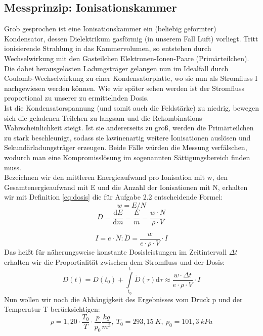 \subsection{Messprinzip: Ionisationskammer}
Grob gesprochen ist eine Ionisationskammer ein (beliebig geformter) Kondensator, dessen Dielektrikum gasförmig (in unserem Fall Luft) vorliegt. Tritt ionisierende Strahlung in das Kammervolumen, so entstehen durch Wechselwirkung mit den Gasteilchen Elektronen-Ionen-Paare (Primärteilchen). Die dabei herausgelösten Ladungsträger gelangen nun im Idealfall durch Coulomb-Wechselwirkung zu einer Kondensatorplatte, wo sie nun als Stromfluss I nachgewiesen werden können. Wie wir später sehen werden ist der Stromfluss proportional zu unserer zu ermittelnden Dosis.\\ 
Ist die Kondensatorspannung (und somit auch die Feldstärke) zu niedrig, bewegen sich die geladenen Teilchen zu langsam und die Rekombinations-Wahrscheinlichkeit steigt. Ist sie andererseits zu groß, werden die Primärteilchen zu stark beschleunigt, sodass sie lawinenartig weitere Ionisationen auslösen und Sekundärladungsträger erzeugen. Beide Fälle würden die Messung verfälschen, wodurch man eine Kompromisslösung im sogenannten Sättigungsbereich finden muss.\\
Bezeichnen wir den mittleren Energieaufwand pro Ionisation mit w, den Gesamtenergieaufwand mit E und die Anzahl der Ionisationen mit N, erhalten wir mit Definition \eqref{eq:dosis} die für Aufgabe 2.2 entscheidende Formel:
\begin{equation}
	w = E / N
\end{equation}
\begin{equation}
	D = \frac{\textrm{d}E}{\textrm{d}m}=\frac{E}{m}=\frac{w \cdot N}{\rho \cdot V}
\end{equation}

\begin{equation}
	I = e \cdot \dot{N}: \dot{D} = \frac{w}{e \cdot \rho \cdot V} \cdot I
\end{equation}
Das heißt für näherungsweise konstante Dosisleistungen im Zeitintervall $\Delta t$ erhalten wir die Proportialität zwischen dem Stromfluss und der Dosis:
\begin{equation}
	D(t) = D(t_0) + \int \limits_{t_0}^{t} \dot{D}(\tau) \mathrm{d}\tau \approx \frac{w \cdot \Delta t}{e \cdot \rho \cdot V} \cdot I
\end{equation}
Nun wollen wir noch die Abhängigkeit des Ergebnisses vom Druck p und der Temperatur T berücksichtigen:
\begin{equation}
	\rho = 1,20 \cdot \frac{T_0}{T} \cdot \frac{p}{p_0} \frac{kg}{m^3},
	\ T_0 = 293,15\ K,\ p_0 = 101,3\ kPa
\end{equation}

